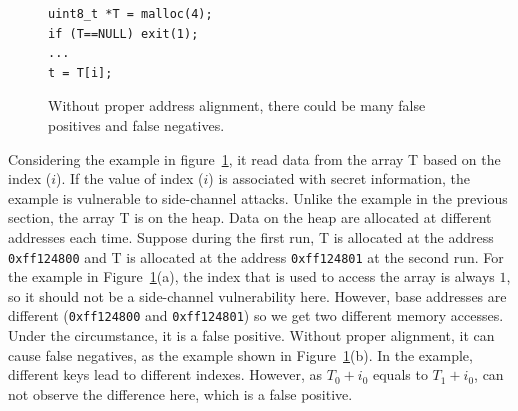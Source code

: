 \begin{figure}[h]
  \begin{minipage}{0.45\linewidth}
    \begin{lstlisting}[numbers=none,xleftmargin=.1\textwidth,xrightmargin=.2\textwidth]
uint8_t *T = malloc(4);
if (T==NULL) exit(1);
...
t = T[i];    
\end{lstlisting}
  \end{minipage}
  \hfill
  \begin{minipage}{0.5\linewidth}
  \end{minipage}
  \caption{Without proper address alignment, there could be many false positives and false negatives.}\label{fig:align}
\end{figure}

Considering the example in figure~\ref{fig:align}, it read data from the array \textsf{T} based on the index ($i$). If the value of index ($i$) is associated with secret information, the example is vulnerable to side-channel attacks. Unlike the example in the previous section, the array \textsf{T} is on the heap. Data on the heap are allocated at different addresses each time. Suppose during the first run, \textsf{T} is allocated at the address \texttt{0xff124800} and \textsf{T} is allocated at the address \texttt{0xff124801} at the second run. For the example in Figure~\ref{fig:align}(a), the index that is used to access the array is always $1$, so it should not be a side-channel vulnerability here. However, base addresses are different (\texttt{0xff124800} and \texttt{0xff124801}) so we get two different memory accesses. Under the circumstance, it is a false positive. Without proper alignment, it can cause false negatives, as the example shown in Figure~\ref{fig:align}(b). In the example, different keys lead to different indexes. However, as $T_0 + i_0$ equals to $T_1 + i_0$, \ctool{} can not observe the difference here, which is a false positive.

